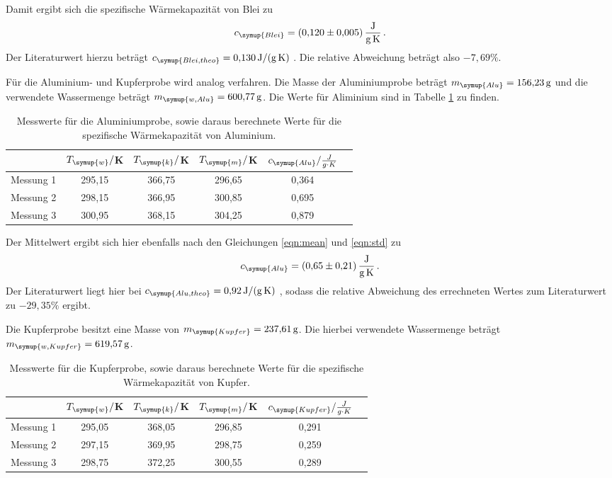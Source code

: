 Damit ergibt sich die spezifische Wärmekapazität von Blei zu
\begin{equation}
  c_{\symup{Blei}} = \SI{0.120(0005)}{\joule\per\gram\per\kelvin} \,.\nonumber
\end{equation}
Der Literaturwert hierzu beträgt $c_{\symup{Blei,theo}}=\SI{0.130}{\joule\per\gram\per\kelvin}$ \cite{werte}.
Die relative Abweichung beträgt also $-7,69\%$.

Für die Aluminium- und Kupferprobe wird analog verfahren. Die Masse der Aluminiumprobe
beträgt $m_{\symup{Alu}}=\SI{156.23}{\gram}$ und die verwendete Wassermenge
beträgt $m_{\symup{w,Alu}}=\SI{600.77}{\gram}$. Die Werte für Aliminium sind in
Tabelle \ref{tab:alu} zu finden.

\begin{table}
  \centering
  \caption{Messwerte für die Aluminiumprobe, sowie daraus berechnete Werte für die spezifische
  Wärmekapazität von Aluminium.}
  \label{tab:alu}
  \begin{tabular}{c c c c c c}
    \toprule
    & $T_{\symup{w}}/$K & $T_{\symup{k}}/$K & $T_{\symup{m}}/$K & $c_{\symup{Alu}}/\frac{J}{g\cdot K}$ \\
    \midrule
    Messung 1 & 295,15 & 366,75 & 296,65 & 0,364 \\
    Messung 2 & 298,15 & 366,95 & 300,85 & 0,695 \\
    Messung 3 & 300,95 & 368,15 & 304,25 & 0,879 \\
    \bottomrule
  \end{tabular}
\end{table}

Der Mittelwert ergibt sich hier ebenfalls nach den Gleichungen \eqref{eqn:mean} und
\eqref{eqn:std} zu
\begin{equation}
  c_{\symup{Alu}} = \SI{0.65(021)}{\joule\per\gram\per\kelvin} \,.\nonumber
\end{equation}
Der Literaturwert liegt hier bei $c_{\symup{Alu,theo}}=\SI{0.92}{\joule\per\gram\per\kelvin}$ \cite{werte},
sodass die relative Abweichung des errechneten Wertes zum Literaturwert zu
$-29,35\%$ ergibt.


Die Kupferprobe besitzt eine Masse von $m_{\symup{Kupfer}}=\SI{237.61}{\gram}$.
Die hierbei verwendete Wassermenge beträgt $m_{\symup{w,Kupfer}}=\SI{619.57}{\gram}$.

\begin{table}
  \centering
  \caption{Messwerte für die Kupferprobe, sowie daraus berechnete Werte für die spezifische
  Wärmekapazität von Kupfer.}
  \label{tab:kupfer}
  \begin{tabular}{c c c c c c}
    \toprule
    & $T_{\symup{w}}/$K & $T_{\symup{k}}/$K & $T_{\symup{m}}/$K & $c_{\symup{Kupfer}}/\frac{J}{g\cdot K}$ \\
    \midrule
    Messung 1 & 295,05 & 368,05 & 296,85 & 0,291 \\
    Messung 2 & 297,15 & 369,95 & 298,75 & 0,259 \\
    Messung 3 & 298,75 & 372,25 & 300,55 & 0,289 \\
    \bottomrule
  \end{tabular}
\end{table}

